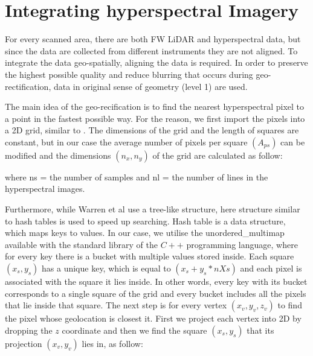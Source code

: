 \documentclass{subfiles}
\begin{document}
	
\section{Integrating hyperspectral Imagery}


	\par For every scanned area, there are both FW LiDAR and hyperspectral data, but since the data are collected from different instruments they are not aligned. To integrate the data geo-spatially, aligning the data is required. In order to preserve the highest possible quality and reduce blurring that occurs during geo-rectification, data in original sense of geometry (level 1) are used.
	
	\par The main idea of the geo-recification is to find the nearest hyperspectral pixel to a point in the fastest possible way. For the reason, we first import the pixels into a 2D grid, similar to \cite{Warren2014}. The dimensions of the grid and the length of squares are constant, but in our case the average number of pixels per square $(A_{ps})$ can be modified and the dimensions $(n_x, n_y)$ of the grid are calculated as follow:
	
	 	
	
	\par where ns = the number of samples and
	nl = the number of lines in the hyperspectral images.
	
	\par Furthermore, while Warren et al use a tree-like structure, here  structure similar to hash tables is used to speed up searching. Hash table is a data structure, which maps keys to values. In our case, we utilise the unordered\_multimap available with the standard library of the $C++$ programming language, where for every key there is a bucket with multiple values stored inside. Each square $(x_s,y_s)$	has a unique key, which is equal to $(x_s + y_s *nXs)$ and each pixel is associated with the square it lies inside. In other words, every key with its bucket corresponds to a single square of the grid and every bucket includes all the pixels that lie inside that square. The next step is for every vertex $(x_v, y_v, z_v)$ to find the pixel whose geolocation is closest it. First we project each vertex into 2D by dropping the $z$ coordinate and then we find the square $(x_s , y_s )$ that its projection $(x_v , y_v)$ lies in, as follow:
	
\end{document}
